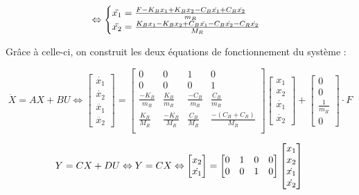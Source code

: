 \documentclass[a4paper,12pt]{article}
\begin{document}
\begin{equation}
    \\ \Leftrightarrow
    \begin{cases}
        \ddot{x_1} = \frac{F - K_B x_1 + K_B x_2 - C_B \dot{x_1} + C_B \dot{x_2}}{m_R} \\
        \ddot{x_2} = \frac{K_B x_1 - K_B x_2 + C_B \dot{x_1} - C_B \dot{x_2} - C_R \dot{x_2}}{M_R}
    \end{cases}
    \label{eq:SommeDesForces}
\end{equation}

Grâce à celle-ci, on construit les deux équations de fonctionnement du système :

\begin{equation}
    \dot{X}=AX+BU
    \Leftrightarrow
    \begin{bmatrix}
        \dot{x_1}\\
        \dot{x_2}\\
        \ddot{x_1}\\
        \ddot{x_2}
    \end{bmatrix}
    =
    \begin{bmatrix}
        0 & 0 & 1 & 0\\
        0 & 0 & 0 & 1\\
        \frac{-K_B}{m_R} & \frac{K_B}{m_R} & \frac{-C_B}{m_R} & \frac{C_B}{m_R}\\
        \frac{K_B}{M_R} & \frac{-K_B}{M_R} & \frac{C_B}{M_R} & \frac{-(C_B+C_R)}{M_R}\\
    \end{bmatrix}
    \begin{bmatrix}
        x_1\\
        x_2\\
        \dot{x_1}\\
        \dot{x_2}
    \end{bmatrix}
    +
    \begin{bmatrix}
        0\\
        0\\
        \frac{1}{m_R}\\
        0
    \end{bmatrix}
    \cdot F
    \label{eq:VarEtatXDot}
\end{equation}

\begin{equation}
    Y=CX+DU
    \Leftrightarrow
    Y=CX
    \Leftrightarrow
    \begin{bmatrix}
        x_2\\
        \dot{x_1}
    \end{bmatrix}
    =
    \begin{bmatrix}
        0 & 1 & 0 & 0\\
        0 & 0 & 1 & 0
    \end{bmatrix}
    \begin{bmatrix}
        x_1\\
        x_2\\
        \dot{x_1}\\
        \dot{x_2}
    \end{bmatrix}\\
    \label{eq:VarEtatY}
\end{equation}
\end{document}
